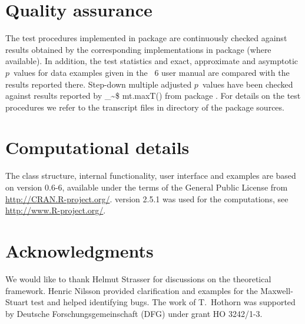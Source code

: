 \documentclass{Z}
\makeatletter
\newcommand\Rcmd{\bgroup\@makeother\_\@makeother\~\@makeother\$\@codez}
\def\@codez#1{{\normalfont\ttfamily\hyphenchar\font=-1 #1()}\egroup}
\makeatother
\begin{document}
\section{Quality assurance}

The test procedures implemented in package  are continuously
checked against results obtained by the corresponding implementations in
package  (where available). In addition, the test statistics
and exact, approximate and asymptotic $p$~values for data examples
given in the ~6 user manual \citep{StatXact6} are compared
with the results reported there. Step-down multiple adjusted $p$~values
have been checked against results reported by \Rcmd{mt.maxT} from
package  \citep{PKG:multtest}. For details on the test
procedures we refer to the  transcript files in directory
 of the  package sources.

\section{Computational details}

The class structure, internal functionality, user interface and examples are
based on  version 0.6-6, available
under the terms of the General Public License from \url{http://CRAN.R-project.org/}. 
 version 2.5.1 was used for 
the computations, see \url{http://www.R-project.org/}.

\section*{Acknowledgments}
 
We would like to thank Helmut Strasser for discussions on the theoretical framework.
Henric Nilsson provided clarification and examples for the Maxwell-Stuart test and helped
identifying bugs. The work of T.~Hothorn was supported by Deutsche Forschungsgemeinschaft (DFG) 
under grant HO 3242/1-3.


\end{document}
